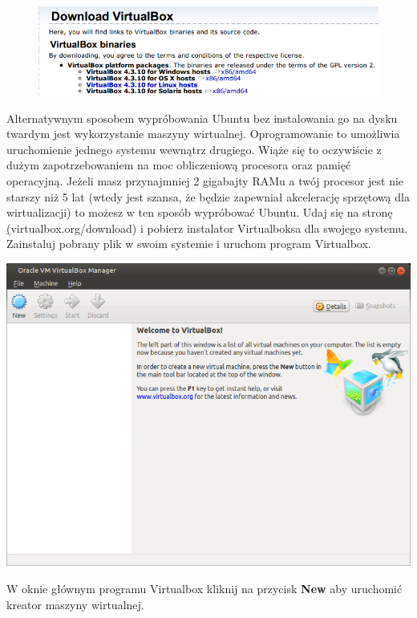 \begin{figure}
                \includegraphics[width=\linewidth]{images/virtualbox_download.png}
\end{figure}
Alternatywnym sposobem wypróbowania Ubuntu bez instalowania go na dysku twardym jest wykorzystanie maszyny wirtualnej. Oprogramowanie to umożliwia uruchomienie jednego systemu wewnątrz drugiego. Wiąże się to oczywiście z dużym zapotrzebowaniem na moc obliczeniową procesora oraz pamięć operacyjną. Jeżeli masz przynajmniej 2 gigabajty RAMu a twój procesor jest nie starszy niż 5 lat (wtedy jest szansa, że będzie zapewniał akcelerację sprzętową dla wirtualizacji) to możesz w ten sposób wypróbować Ubuntu.
Udaj się na stronę \href{https://www.virtualbox.org/wiki/Downloads}(virtualbox.org/download) i pobierz instalator Virtualboksa dla swojego systemu. Zainstaluj pobrany plik w swoim systemie i uruchom program Virtualbox.
\clearpage
\begin{center}
        \includegraphics[scale=0.7]{images/virtualbox_main.png}
\end{center}
W oknie głównym programu Virtualbox kliknij na przycisk \textbf{New} aby uruchomić kreator maszyny wirtualnej.
\clearpage
\twocolumn
